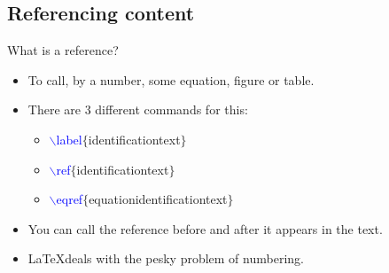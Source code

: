 \documentclass[usenames,dvipsnames,aspectratio=169]{beamer}
\newcommand{\aitem}{\item[$\cdot$]}
\newcommand{\bitem}{\item[-]}
\begin{document}
%

\subsection{Referencing content}
\begin{frame}[t]{What is a reference?}
\begin{itemize}
\aitem To call, by a number, some equation, figure or table.
\aitem There are 3 different commands for this:
\begin{itemize}
\bitem \textcolor{blue}{$\backslash$label}\textcolor{PineGreen}{$\{$identificationtext$\}$}
\bitem \textcolor{blue}{$\backslash$ref}\textcolor{PineGreen}{$\{$identificationtext$\}$}
\bitem \textcolor{blue}{$\backslash$eqref}\textcolor{PineGreen}{$\{$equationidentificationtext$\}$}
\end{itemize}
\aitem You can call the reference before and after it appears in the text.
\aitem \LaTeX deals with the pesky problem of numbering.
\end{itemize}
\end{frame}

\end{document}

